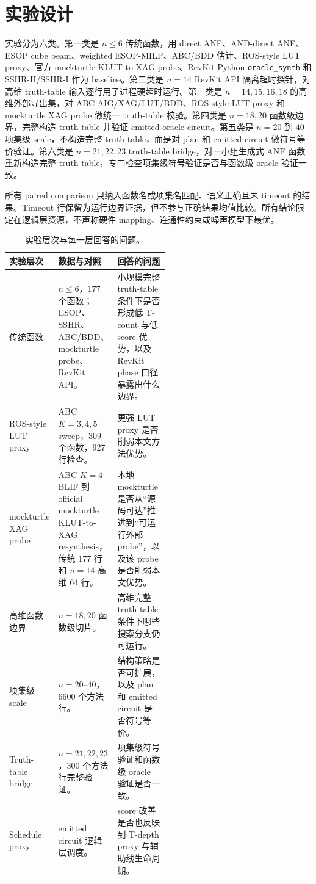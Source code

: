 \documentclass[UTF8,fontset=macnew,11pt]{ctexart}
\newcommand{\anf}{\ensuremath{\mathrm{ANF}}}
\newcommand{\ttable}{truth-table}
\begin{document}
\section{实验设计}

实验分为六类。第一类是 $n\leq6$ 传统函数，用 direct ANF、AND-direct ANF、ESOP cube beam、weighted ESOP-MILP、ABC/BDD 估计、ROS-style LUT proxy、官方 mockturtle KLUT-to-XAG probe、RevKit Python \texttt{oracle\_synth} 和 SSHR-H/SSHR-I 作为 baseline。第二类是 $n=14$ RevKit API 隔离超时探针，对高维 truth-table 输入逐行用子进程硬超时运行。第三类是 $n=14,15,16,18$ 的高维外部导出集，对 ABC-AIG/XAG/LUT/BDD、ROS-style LUT proxy 和 mockturtle XAG probe 做统一 truth-table 校验。第四类是 $n=18,20$ 函数级边界，完整构造 \ttable{} 并验证 emitted oracle circuit。第五类是 $n=20$ 到 $40$ 项集级 scale，不构造完整 \ttable{}，而是对 plan 和 emitted circuit 做符号等价验证。第六类是 $n=21,22,23$ truth-table bridge，对一小组生成式 \anf{} 函数重新构造完整 \ttable{}，专门检查项集级符号验证是否与函数级 oracle 验证一致。

所有 paired comparison 只纳入函数名或项集名匹配、语义正确且未 timeout 的结果。Timeout 行保留为运行边界证据，但不参与正确结果均值比较。所有结论限定在逻辑层资源，不声称硬件 mapping、连通性约束或噪声模型下最优。

\begin{table}[H]
\centering
\scriptsize
\caption{实验层次与每一层回答的问题。}
\label{tab:experiment-layers-v27}
\begin{tabularx}{\linewidth}{>{\raggedright\arraybackslash}p{0.22\linewidth}>{\raggedright\arraybackslash}p{0.30\linewidth}>{\raggedright\arraybackslash}X}
\toprule
实验层次 & 数据与对照 & 回答的问题 \\
\midrule
传统函数 & $n\leq6$，177 个函数；ESOP、SSHR、ABC/BDD、mockturtle probe、RevKit API。 & 小规模完整 truth-table 条件下是否形成低 T-count 与低 score 优势，以及 RevKit phase 口径暴露出什么边界。 \\
ROS-style LUT proxy & ABC $K=3,4,5$ sweep，309 个函数，927 行检查。 & 更强 LUT proxy 是否削弱本文方法优势。 \\
mockturtle XAG probe & ABC $K=4$ BLIF 到 official mockturtle KLUT-to-XAG resynthesis，传统 177 行和 $n=14$ 高维 64 行。 & 本地 mockturtle 是否从“源码可达”推进到“可运行外部 probe”，以及该 probe 是否削弱本文优势。 \\
高维函数边界 & $n=18,20$ 函数级切片。 & 高维完整 truth-table 条件下哪些搜索分支仍可运行。 \\
项集级 scale & $n=20$--$40$，6600 个方法行。 & 结构策略是否可扩展，以及 plan 和 emitted circuit 是否符号等价。 \\
Truth-table bridge & $n=21,22,23$，300 个方法行完整验证。 & 项集级符号验证和函数级 oracle 验证是否一致。 \\
Schedule proxy & emitted circuit 逻辑层调度。 & score 改善是否也反映到 T-depth proxy 与辅助线生命周期。 \\
\bottomrule
\end{tabularx}
\end{table}
\end{document}
